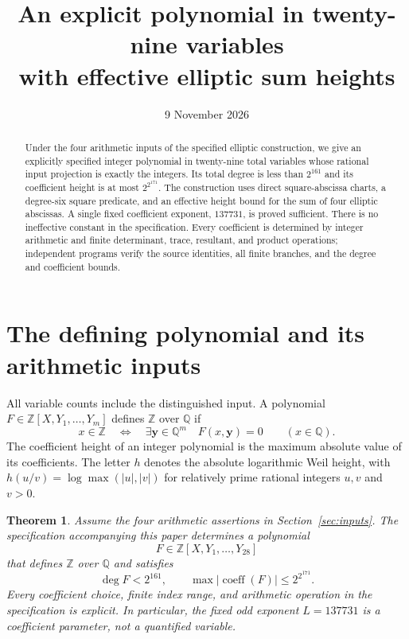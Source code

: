 \documentclass[11pt,a4paper]{article}
\title{An explicit polynomial in twenty-nine variables\\
with effective elliptic sum heights}
\author{}\date{9 November 2026}
\newtheorem{theorem}{Theorem}\newtheorem{lemma}[theorem]{Lemma}
\newcommand{\Q}{\mathbb Q}\newcommand{\Z}{\mathbb Z}
\begin{document}
\maketitle
\begin{abstract}
Under the four arithmetic inputs of the specified elliptic construction,
we give an explicitly specified integer polynomial in twenty-nine total
variables whose rational input projection is exactly the integers.
Its total degree is less than $2^{161}$ and its coefficient height is
at most $2^{2^{171}}$. The construction uses direct square-abscissa
charts, a degree-six square predicate, and an effective height bound
for the sum of four elliptic abscissas. A single fixed coefficient
exponent, $137731$, is proved sufficient. There is no ineffective
constant in the specification. Every coefficient is determined by
integer arithmetic and finite determinant, trace, resultant, and
product operations; independent programs verify the source identities,
all finite branches, and the degree and coefficient bounds.
\end{abstract}

\section{The defining polynomial and its arithmetic inputs}

All variable counts include the distinguished input. A polynomial
$F\in\Z[X,Y_1,\ldots,Y_m]$ defines $\Z$ over $\Q$ if
\[
 x\in\Z\quad\Longleftrightarrow\quad
 \exists\mathbf y\in\Q^m\quad F(x,\mathbf y)=0
 \qquad(x\in\Q).
\]
The coefficient height of an integer polynomial is the maximum
absolute value of its coefficients. The letter $h$ denotes the
absolute logarithmic Weil height, with $h(u/v)=\log\max(|u|,|v|)$
for relatively prime rational integers $u,v$ and $v>0$.

\begin{theorem}\label{thm:main}
Assume the four arithmetic assertions in Section~\ref{sec:inputs}.
The specification accompanying this paper determines a polynomial
\[
                   F\in\Z[X,Y_1,\ldots,Y_{28}]
\]
that defines $\Z$ over $\Q$ and satisfies
\[
             \deg F<2^{161},\qquad
             \max|\operatorname{coeff}(F)|\le2^{2^{171}}.
\]
Every coefficient choice, finite index range, and arithmetic operation
in the specification is explicit. In particular, the fixed odd exponent
$L=137731$ is a coefficient parameter, not a quantified variable.
\end{theorem}
\end{document}
